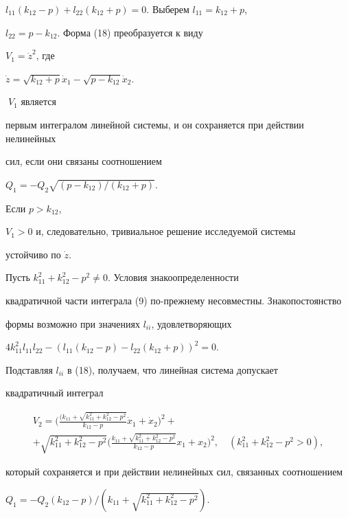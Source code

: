 $l_{11}(k_{12}-p)+l_{22}(k_{12}+p)=0$. Выберем $l_{11}=k_{12}+p$,


$l_{22}=p-k_{12}$. Форма (18) преобразуется к виду


$V_{1}=\Dot{z}^{2}$, где


$\Dot{z}=\sqrt{k_{12}+p}\Dot{x}_{1}-\sqrt{p-k_{12}}\Dot{x}_{2}$.


$\;V_{1}$ является


первым интегралом линейной системы, и он сохраняется при действии нелинейных


сил, если они связаны соотношением


$Q_{1}=-Q_{2}\sqrt{(p-k_{12})/(k_{12}+p)}$.


Если $p>k_{12}$,


$V_{1}>0$ и, следовательно, тривиальное решение исследуемой системы


устойчиво по $\Dot{z}$.





Пусть $k_{11}^{2}+k_{12}^{2}-p^{2}\ne 0$. Условия знакоопределенности


квадратичной части интеграла (9) по-прежнему несовместны. Знакопостоянство


формы возможно при значениях $l_{ii}$, удовлетворяющих


$4k_{11}^{2}l_{11}l_{22}-(l_{11}(k_{12}-p)-l_{22}(k_{12}+p))^{2}=0$.


Подставляя $l_{ii}$ в (18), получаем, что линейная система допускает


квадратичный интеграл


\begin{multline*}


V_{2}=\biggl(\frac{(k_{11}+\sqrt{k_{11}^{2}+k_{12}^{2}-p^{2}}}{k_{12}-p}


\Dot x_{1}+\Dot x_{2}\biggr)^{2}+\\


%


+\sqrt{k_{11}^{2}+k_{12}^{2}-p^{2}}


\biggl(\frac{k_{11}+\sqrt{k_{11}^{2}+k_{12}^{2}-p^{2}}}{k_{12}-p}


x_{1}+ x_{2}\biggr)^{2},\quad


(k_{11}^{2}+k_{12}^{2}-p^{2}>0),


\end{multline*}


который сохраняется и при действии нелинейных сил, связанных соотношением


$Q_{1}=-Q_{2}(k_{12}-p)/(k_{11}+\sqrt{k_{11}^{2}+k_{12}^{2}-p^{2}})$.


